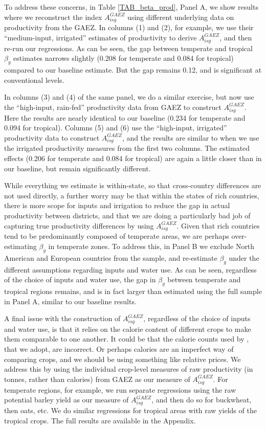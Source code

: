 \documentclass[11pt]{article}
\begin{document}
To address these concerns, in Table \ref{TAB_beta_prod}, Panel A, we show results where we reconstruct the index $A_{isg}^{GAEZ}$ using different underlying data on productivity from the GAEZ. In columns (1) and (2), for example, we use their ``medium-input, irrigated'' estimates of productivity to derive $A_{isg}^{GAEZ}$, and then re-run our regressions. As can be seen, the gap between temperate and tropical $\beta_g$ estimates narrows slightly (0.208 for temperate and 0.084 for tropical) compared to our baseline estimate. But the gap remains 0.12, and is significant at conventional levels.

In columns (3) and (4) of the same panel, we do a similar exercise, but now use the ``high-input, rain-fed'' productivity data from GAEZ to construct $A_{isg}^{GAEZ}$. Here the results are nearly identical to our baseline (0.234 for temperate and 0.094 for tropical). Columns (5) and (6) use the ``high-input, irrigated'' productivity data to construct $A_{isg}^{GAEZ}$, and the results are similar to when we use the irrigated productivity measures from the first two columns. The estimated effects (0.206 for temperate and 0.084 for tropical) are again a little closer than in our baseline, but remain significantly different.

While everything we estimate is within-state, so that cross-country differences are not used directly, a further worry may be that within the states of rich countries, there is more scope for inputs and irrigation to reduce the gap in actual productivity between districts, and that we are doing a particularly bad job of capturing true productivity differences by using $A_{isg}^{GAEZ}$. Given that rich countries tend to be predominantly composed of temperate areas, we are perhaps over-estimating $\beta_g$ in temperate zones. To address this, in Panel B we exclude North American and European countries from the sample, and re-estimate $\beta_g$ under the different assumptions regarding inputs and water use. As can be seen, regardless of the choice of inputs and water use, the gap in $\beta_g$ between temperate and tropical regions remains, and is in fact larger than estimated using the full sample in Panel A, similar to our baseline results.

A final issue with the construction of $A^{GAEZ}_{isg}$, regardless of the choice of inputs and water use, is that it relies on the calorie content of different crops to make them comparable to one another. It could be that the calorie counts used by \cite{galorozak2016}, that we adopt, are incorrect. Or perhaps calories are an imperfect way of comparing crops, and we should be using something like relative prices. We address this by using the individual crop-level measures of raw productivity (in tonnes, rather than calories) from GAEZ as our measure of $A^{GAEZ}_{isg}$. For temperate regions, for example, we run separate regressions using the raw potential barley yield as our measure of $A^{GAEZ}_{isg}$, and then do so for buckwheat, then oats, etc. We do similar regressions for tropical areas with raw yields of the tropical crops. The full results are available in the Appendix. 
\end{document}

